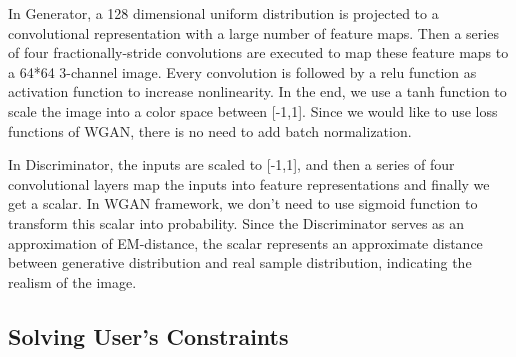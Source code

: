 In Generator, a 128 dimensional uniform distribution is projected to a convolutional representation with a large number of feature maps. Then a series of four fractionally-stride convolutions are executed to map these feature maps to a 64*64 3-channel image. Every convolution is followed by a relu function as activation function to increase nonlinearity. In the end, we use a tanh function to scale the image into a color space between [-1,1]. Since we would like to use loss functions of WGAN, there is no need to add batch normalization.

In Discriminator, the inputs are scaled to [-1,1], and then a series of four convolutional layers map the inputs into feature representations and finally we get a scalar. In WGAN framework, we don’t need to use sigmoid function to transform this scalar into probability. Since the Discriminator serves as an approximation of EM-distance, the scalar represents an approximate distance between generative distribution and real sample distribution, indicating the realism of the image.


\subsection{Solving User’s Constraints}

